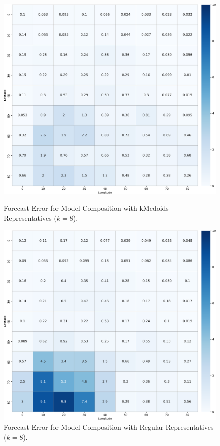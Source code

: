 \begin{figure}[!htbp]
  \centering
  \begin{minipage}[b]{0.45\textwidth}
    \includegraphics[width=\textwidth]{../Figures/query_10x10_kmedoids_k8-1000dpi}
    \caption{Forecast Error for Model Composition with kMedoids Representatives ($k=8$).}
    \label{Fig:kMedoid_10x10_k8}
  \end{minipage}
  \hfill
  \begin{minipage}[b]{0.45\textwidth}
    \includegraphics[width=\textwidth]{../Figures/query_10x10_regular_k8-1000dpi}
    \caption{Forecast Error for Model Composition with Regular Representatives ($k=8$).}
    \label{Fig:Regular_10x10_k8}
  \end{minipage}


\end{figure}
